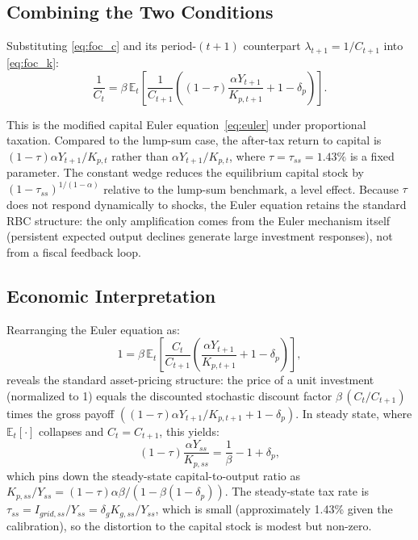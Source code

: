 	\subsection*{Combining the Two Conditions}
	
	Substituting \eqref{eq:foc_c} and its period-$(t+1)$ counterpart $\lambda_{t+1} = 1/C_{t+1}$ into \eqref{eq:foc_k}:
	\begin{equation*}
		\frac{1}{C_t} = \beta\,\mathbb{E}_t\!\left[\frac{1}{C_{t+1}}
		\left((1-\tau)\frac{\alpha Y_{t+1}}{K_{p,t+1}} + 1 - \delta_p\right)\right].
	\end{equation*}
	
	This is the modified capital Euler equation~\eqref{eq:euler} under proportional taxation. Compared to the lump-sum case, the after-tax return to capital is $(1-\tau)\alpha Y_{t+1}/K_{p,t}$ rather than $\alpha Y_{t+1}/K_{p,t}$, where $\tau = \tau_{ss} = 1.43\%$ is a fixed parameter. The constant wedge reduces the equilibrium capital stock by $(1-\tau_{ss})^{1/(1-\alpha)}$ relative to the lump-sum benchmark, a level effect. Because $\tau$ does not respond dynamically to shocks, the Euler equation retains the standard RBC structure: the only amplification comes from the Euler mechanism itself (persistent expected output declines generate large investment responses), not from a fiscal feedback loop.
	
	\subsection*{Economic Interpretation}
	
	Rearranging the Euler equation as:
	\begin{equation*}
		1 = \beta\,\mathbb{E}_t\!\left[\frac{C_t}{C_{t+1}}
		\left(\frac{\alpha Y_{t+1}}{K_{p,t+1}} + 1 - \delta_p\right)\right],
	\end{equation*}
	reveals the standard asset-pricing structure: the price of a unit investment (normalized to 1) equals the discounted stochastic discount factor $\beta\,(C_t/C_{t+1})$ times the gross payoff $((1-\tau)\alpha Y_{t+1}/K_{p,t+1} + 1 - \delta_p)$. In steady state, where $\mathbb{E}_t[\cdot]$ collapses and $C_t = C_{t+1}$, this yields:
	\begin{equation*}
		(1-\tau)\frac{\alpha Y_{ss}}{K_{p,ss}} = \frac{1}{\beta} - 1 + \delta_p,
	\end{equation*}
	which pins down the steady-state capital-to-output ratio as $K_{p,ss}/Y_{ss} = (1-\tau)\alpha\beta/(1 - \beta(1-\delta_p))$. The steady-state tax rate is $\tau_{ss} = I_{grid,ss}/Y_{ss} = \delta_g K_{g,ss}/Y_{ss}$, which is small (approximately 1.43\% given the calibration), so the distortion to the capital stock is modest but non-zero.
	

